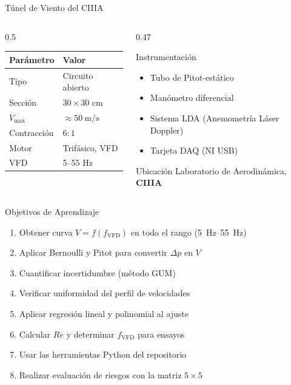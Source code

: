 \documentclass[aspectratio=169,12pt]{beamer}
\begin{document}
\begin{frame}{Túnel de Viento del CIIIA}
	\begin{columns}
		\begin{column}{0.5\textwidth}
			\centering\small
			\begin{tabular}{ll}
				\toprule
				\textbf{Parámetro} & \textbf{Valor}             \\
				\midrule
				Tipo               & Circuito abierto           \\
				Sección            & $30\times30$ cm            \\
				$V_\mathrm{max}$   & $\approx\SI{50}{\m\per\s}$ \\
				Contracción        & $6{:}1$                    \\
				Motor              & Trifásico, VFD             \\
				VFD                & 5--55 Hz                   \\
				\bottomrule
			\end{tabular}
		\end{column}
		\begin{column}{0.47\textwidth}
			\begin{block}{Instrumentación}
				\begin{itemize}
					\item Tubo de Pitot-estático
					\item Manómetro diferencial
					\item Sistema LDA (Anemometría Láser Doppler)
					\item Tarjeta DAQ (NI USB)
				\end{itemize}
			\end{block}
			\vspace{0.2em}
			\begin{exampleblock}{Ubicación}
				Laboratorio de Aerodinámica,\\
				\textbf{CIIIA}
			\end{exampleblock}
		\end{column}
	\end{columns}
\end{frame}

\begin{frame}{Objetivos de Aprendizaje}
	\begin{enumerate}
		\item Obtener curva $V = f(f_\mathrm{VFD})$ en todo el rango
		      (\SIrange{5}{55}{\Hz})
		\item Aplicar Bernoulli y Pitot para convertir $\Delta p$ en $V$
		\item Cuantificar incertidumbre (método GUM)
		\item Verificar uniformidad del perfil de velocidades
		\item Aplicar regresión lineal y polinomial al ajuste
		\item Calcular $Re$ y determinar $f_\mathrm{VFD}$ para ensayos
		\item Usar las herramientas Python del repositorio
		\item Realizar evaluación de riesgos con la matriz $5\times5$
	\end{enumerate}
\end{frame}
\end{document}
